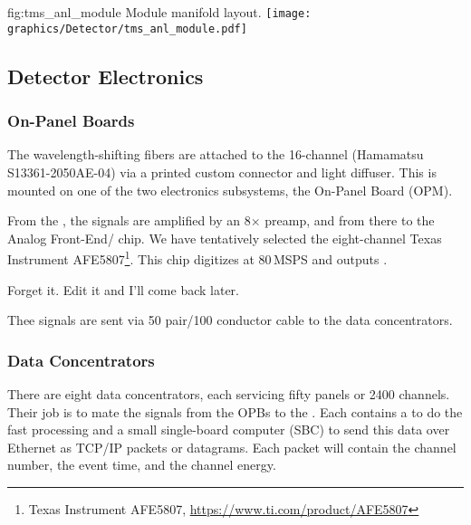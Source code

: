 \begin{dunefigure}{fig:tms_anl_module}
{Module manifold layout.}
\texttt{[image: graphics/Detector/tms\_anl\_module.pdf]}
\end{dunefigure}

\subsection{Detector Electronics}
\label{sec:tms-des-electronics}
\subsubsection{On-Panel Boards}
\label{sec:tms-des-elect-OPB}


The wavelength-shifting fibers are attached to the
16-channel  (Hamamatsu S13361-2050AE-04) via a 
\threed printed custom connector and light diffuser. This is mounted on 
one of the two electronics subsystems, the On-Panel Board (OPM).

From the , the signals are amplified by an 8$\times$ preamp,
and from there to the Analog Front-End/ chip. We
have tentatively selected the eight-channel Texas Instrument AFE5807\footnote{Texas Instrument\texttrademark{} AFE5807, \url{https://www.ti.com/product/AFE5807}}.
This chip digitizes at 80\,MSPS and outputs .

Forget it. Edit it and I'll come back later.

Thee  signals are sent via 50 pair/100 conductor cable
to the data concentrators.

\subsubsection{Data Concentrators}
\label{sec:tms-des-elect-DC}

There are eight data concentrators, each servicing fifty
panels or 2400 channels. Their job is to mate the
   signals from the OPBs to the . Each contains
a  to do the fast processing and a small single-board
computer (SBC) to send this data over Ethernet as 
TCP/IP packets or  datagrams. Each packet will
contain the channel number, the event time, and the channel
energy.



